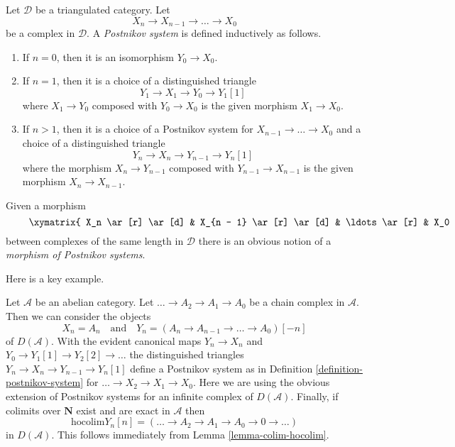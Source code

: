\begin{definition}
\label{definition-postnikov-system}
Let $\mathcal{D}$ be a triangulated category. Let
$$
X_n \to X_{n - 1} \to \ldots \to X_0
$$
be a complex in $\mathcal{D}$. A {\it Postnikov system} is defined
inductively as follows.
\begin{enumerate}
\item If $n = 0$, then it is an isomorphism $Y_0 \to X_0$.
\item If $n = 1$, then it is a choice of a distinguished triangle
$$
Y_1 \to X_1 \to Y_0 \to Y_1[1]
$$
where $X_1 \to Y_0$ composed with $Y_0 \to X_0$ is the given morphism
$X_1 \to X_0$.
\item If $n > 1$, then it is a choice of a Postnikov system
for $X_{n - 1} \to \ldots \to X_0$ and a choice of a distinguished
triangle
$$
Y_n \to X_n \to Y_{n - 1} \to Y_n[1]
$$
where the morphism $X_n \to Y_{n - 1}$ composed with
$Y_{n - 1} \to X_{n - 1}$ is the given morphism $X_n \to X_{n - 1}$.
\end{enumerate}
Given a morphism
\begin{equation}
\label{equation-map-complexes}
\vcenter{
\xymatrix{
X_n \ar[r] \ar[d] &
X_{n - 1} \ar[r] \ar[d] &
\ldots \ar[r] &
X_0 \ar[d] \\
X'_n \ar[r] &
X'_{n - 1} \ar[r] &
\ldots \ar[r] &
X'_0
}
}
\end{equation}
between complexes of the same length in $\mathcal{D}$
there is an obvious notion of a {\it morphism of Postnikov systems}.
\end{definition}

\noindent
Here is a key example.

\begin{example}
\label{example-key-postnikov}
Let $\mathcal{A}$ be an abelian category. Let $\ldots \to A_2 \to A_1 \to A_0$
be a chain complex in $\mathcal{A}$.
Then we can consider the objects
$$
X_n = A_n
\quad\text{and}\quad
Y_n = (A_n \to A_{n - 1} \to \ldots \to A_0)[-n]
$$
of $D(\mathcal{A})$. With the evident canonical maps $Y_n \to X_n$ and
$Y_0 \to Y_1[1] \to Y_2[2] \to \ldots$ the distinguished triangles
$Y_n \to X_n \to Y_{n - 1} \to Y_n[1]$ define a Postnikov system as in
Definition \ref{definition-postnikov-system} for
$\ldots \to X_2 \to X_1 \to X_0$. Here we are using the obvious
extension of Postnikov systems for an infinite complex of $D(\mathcal{A})$.
Finally, if colimits over $\mathbf{N}$ exist and are exact in $\mathcal{A}$
then
$$
\text{hocolim} Y_n[n] = (\ldots \to A_2 \to A_1 \to A_0 \to 0 \to \ldots)
$$
in $D(\mathcal{A})$. This follows immediately from
Lemma \ref{lemma-colim-hocolim}.
\end{example}

